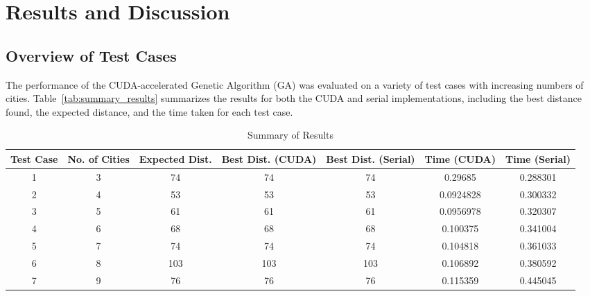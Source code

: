 \documentclass[conference]{IEEEtran}
\begin{document}
\section{Results and Discussion}
\subsection{Overview of Test Cases}

The performance of the CUDA-accelerated Genetic Algorithm (GA) was evaluated on a variety of test cases with increasing numbers of cities. Table~\ref{tab:summary_results} summarizes the results for both the CUDA and serial implementations, including the best distance found, the expected distance, and the time taken for each test case.


\begin{table*}[ht]
\centering
\caption{Summary of Results}
\begin{tabular}{|c|c|c|c|c|c|c|}
\hline
\textbf{Test Case} & \textbf{No. of Cities} & \textbf{Expected Dist.} & \textbf{Best Dist. (CUDA)} & \textbf{Best Dist. (Serial)} & \textbf{Time (CUDA)} & \textbf{Time (Serial)} \\ \hline
1                  & 3                      & 74                      & 74                         & 74                          & 0.29685             & 0.288301              \\ \hline
2                  & 4                      & 53                      & 53                         & 53                          & 0.0924828           & 0.300332              \\ \hline
3                  & 5                      & 61                      & 61                         & 61                          & 0.0956978           & 0.320307              \\ \hline
4                  & 6                      & 68                      & 68                         & 68                          & 0.100375            & 0.341004              \\ \hline
5                  & 7                      & 74                      & 74                         & 74                          & 0.104818            & 0.361033              \\ \hline
6                  & 8                      & 103                     & 103                        & 103                         & 0.106892            & 0.380592              \\ \hline
7                  & 9                      & 76                      & 76                         & 76                          & 0.115359            & 0.445045              \\ \hline

\end{tabular}
\end{table*}
\end{document}
